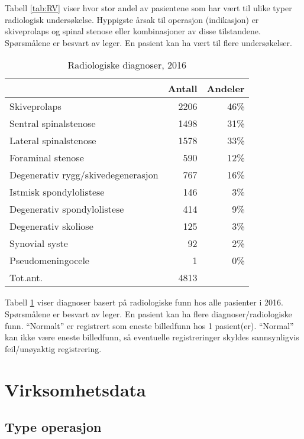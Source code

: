 \documentclass [norsk,a4paper,twoside]{article}\usepackage[]{graphicx}\usepackage[]{color}
\begin{document}
Tabell \ref{tab:RV} viser hvor stor andel av pasientene som har vært til ulike typer 
radiologisk undersøkelse. Hyppigste årsak til operasjon (indikasjon) er skiveprolaps og spinal stenose eller kombinasjoner av disse tilstandene.
Spørsmålene er besvart av leger. En pasient kan ha vært til flere undersøkelser.




\begin{table}[ht]
\centering
\begin{tabular}{lrr}
  \hline
 & Antall & Andeler \\ 
  \hline
Skiveprolaps & 2206 & 46\% \\ 
  Sentral spinalstenose & 1498 & 31\% \\ 
  Lateral spinalstenose & 1578 & 33\% \\ 
  Foraminal stenose & 590 & 12\% \\ 
  Degenerativ rygg/skivedegenerasjon & 767 & 16\% \\ 
  Istmisk spondylolistese & 146 & 3\% \\ 
  Degenerativ spondylolistese & 414 & 9\% \\ 
  Degenerativ skoliose & 125 & 3\% \\ 
  Synovial syste & 92 & 2\% \\ 
  Pseudomeningocele & 1 & 0\% \\ 
  Tot.ant. & 4813 &   \\ 
   \hline
\end{tabular}
\caption{Radiologiske diagnoser, 2016} 
\label{tab:RF}
\end{table}


Tabell \ref{tab:RF} viser diagnoser basert på radiologiske funn hos alle pasienter 
i 2016. 
Spørsmålene er besvart av leger.
En pasient kan ha flere diagnoser/radiologiske funn.
``Normalt'' er registrert som eneste billedfunn hos 1 pasient(er).
                                  ``Normal'' kan ikke være eneste billedfunn, så eventuelle registreringer skyldes sannsynligvis 
                                  feil/unøyaktig registrering.




\section{Virksomhetsdata}

\subsection{Type operasjon}
\end{document}

